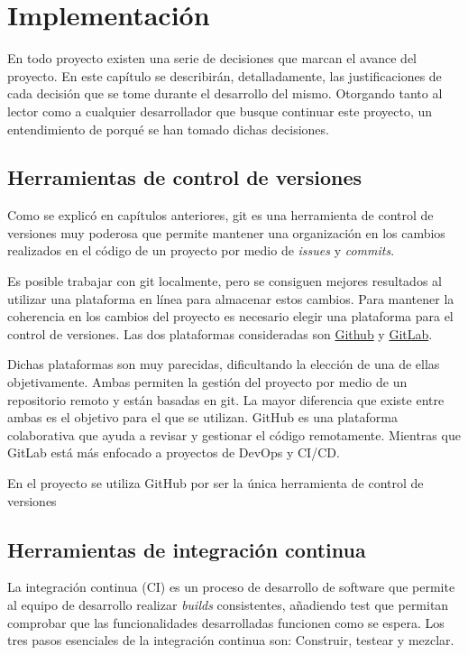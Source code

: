 \chapter{Implementación}
En todo proyecto existen una serie de decisiones que marcan el avance del proyecto. En este capítulo se describirán, detalladamente, las justificaciones de cada decisión que se tome durante el desarrollo del mismo. Otorgando tanto al lector como a cualquier desarrollador que busque continuar este proyecto, un entendimiento de porqué se han tomado dichas decisiones.

\section{Herramientas de control de versiones}
Como se explicó en capítulos anteriores, \Gls{git} es una herramienta de control de versiones muy poderosa que permite mantener una organización en los cambios realizados en el código de un proyecto por medio de \emph{issues} y \emph{commits}.

Es posible trabajar con \Gls{git} localmente, pero se consiguen mejores resultados al utilizar una plataforma en línea para almacenar estos cambios. Para mantener la coherencia en los cambios del proyecto es necesario elegir una plataforma para el control de versiones. Las dos plataformas consideradas son \href{https://github.com/}{Github} y \href{https://about.gitlab.com/}{GitLab}. 

Dichas plataformas son muy parecidas, dificultando la elección de una de ellas objetivamente. Ambas permiten la gestión del proyecto por medio de un repositorio remoto y están basadas en \Gls{git}. La mayor diferencia que existe entre ambas es el objetivo para el que se utilizan. GitHub es una plataforma colaborativa que ayuda a revisar y gestionar el código remotamente. Mientras que GitLab está más enfocado a proyectos de DevOps y CI/CD. \cite{VCS2022}

En el proyecto se utiliza GitHub por ser la única herramienta de control de versiones  

\section{Herramientas de integración continua}
La integración continua (CI) es un proceso de desarrollo de software que permite al equipo de desarrollo realizar \emph{builds} consistentes, añadiendo test que permitan comprobar que las funcionalidades desarrolladas funcionen como se espera. Los tres pasos esenciales de la integración continua son: Construir, testear y mezclar.

